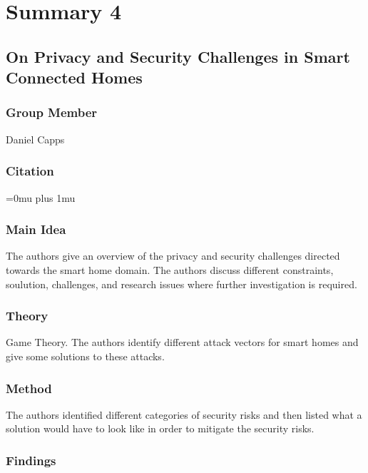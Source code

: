 \section{Summary 4}

\noindent
\subsection{{O}n {P}rivacy and {S}ecurity {C}hallenges in {S}mart {C}onnected {H}omes}

\subsubsection{Group Member}

\noindent
Daniel Capps

\noindent
\subsubsection{Citation}

\Urlmuskip=0mu plus 1mu\relax


\subsubsection{Main Idea}

\noindent
The authors give an overview of the privacy and security challenges directed towards the smart home domain. The authors discuss different constraints, soulution, challenges, and research issues where further investigation is required.

\subsubsection{Theory}

\noindent
Game Theory. The authors identify different attack vectors for smart homes and give some solutions to these attacks.

\subsubsection{Method}

\noindent
The authors identified different categories of security risks and then listed what a solution would have to look like in order to mitigate the security risks.

\subsubsection{Findings}

